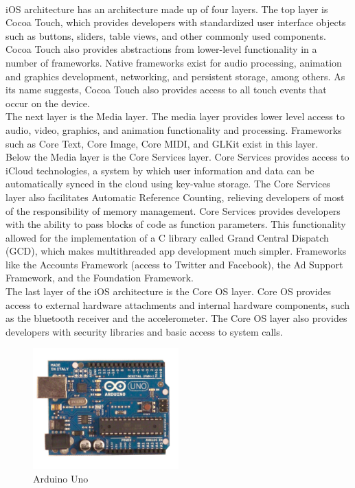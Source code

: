 \documentclass[twoside]{article}
\begin{document}
\begin{multicols}{2}
\\
iOS architecture has an architecture made up of four layers. The top layer is Cocoa Touch, which provides developers with standardized user interface objects such as buttons, sliders, table views, and other commonly used components. Cocoa Touch also provides abstractions from lower-level functionality in a number of frameworks. Native frameworks exist for audio processing, animation and graphics development, networking, and persistent storage, among others. As its name suggests, Cocoa Touch also provides access to all touch events that occur on the device. \\
The next layer is the Media layer. The media layer provides lower level access to audio, video, graphics, and animation functionality and processing. Frameworks such as Core Text, Core Image, Core MIDI, and GLKit exist in this layer. \\
Below the Media layer is the Core Services layer. Core Services provides access to iCloud technologies, a system by which user information and data can be automatically synced in the cloud using key-value storage. The Core Services layer also facilitates Automatic Reference Counting, relieving developers of most of the responsibility of memory management. Core Services provides developers with the ability to pass blocks of code as function parameters. This functionality allowed for the implementation of a C library called Grand Central Dispatch (GCD), which makes multithreaded app development much simpler. Frameworks like the Accounts Framework (access to Twitter and Facebook), the Ad Support Framework, and the Foundation Framework. \\
The last layer of the iOS architecture is the Core OS layer. Core OS provides access to external hardware attachments and internal hardware components, such as the bluetooth receiver and the accelerometer. The Core OS layer also provides developers with security libraries and basic access to system calls. \\

\begin{figure}[H]
\centering
\includegraphics[width=0.5\textwidth]{arduino.jpg}
\caption{Arduino Uno}
\end{figure}
\\

\end{multicols}
\end{document}
